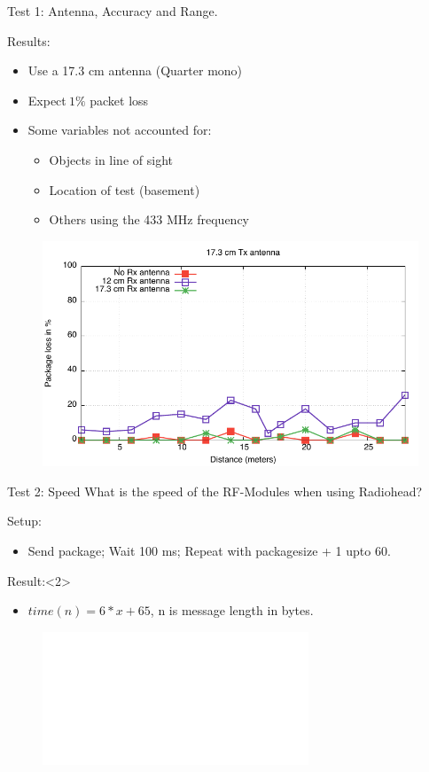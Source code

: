 \begin{frame}{Test 1: Antenna, Accuracy and Range.}
    \begin{block}{Results:}
        \begin{itemize}
            \item Use a 17.3 cm antenna (Quarter mono)
            \item Expect$~1 \%$ packet loss
            \item Some variables not accounted for:
            \begin{itemize}
                \item Objects in line of sight
                \item Location of test (basement)
                \item Others using the 433 MHz frequency
            \end{itemize}
        \end{itemize}
    \end{block}
    
    \begin{figure}
        \includegraphics[height=0.4\textheight,keepaspectratio]{figures/17cm_ant.pdf}
    \end{figure}
\end{frame}

\begin{frame}{Test 2: Speed}
    What is the speed of the RF-Modules when using Radiohead?
    \begin{block}{Setup:}
        \begin{itemize}
            \item Send package; Wait 100 ms; Repeat with packagesize + 1 upto 60.
        \end{itemize}
    \end{block}

    \begin{block}{Result:}<2>
        \begin{itemize}
            \item $time(n)=6 * x + 65$, n is message length in bytes.
        \end{itemize}
    \end{block}
    
    \begin{figure}
        \includegraphics<2>[height=0.4\textheight,keepaspectratio]{figures/time_length.pdf}
    \end{figure}
\end{frame}

